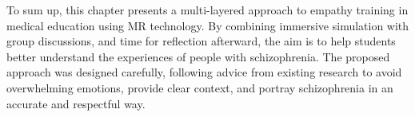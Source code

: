\vspace{1em}

To sum up, this chapter presents a multi-layered approach to empathy training in medical education using MR technology. By combining immersive simulation with group discussions, and time for reflection afterward, the aim is to help students better understand the experiences of people with schizophrenia. The proposed approach was designed carefully, following advice from existing research to avoid overwhelming emotions, provide clear context, and portray schizophrenia in an accurate and respectful way.
